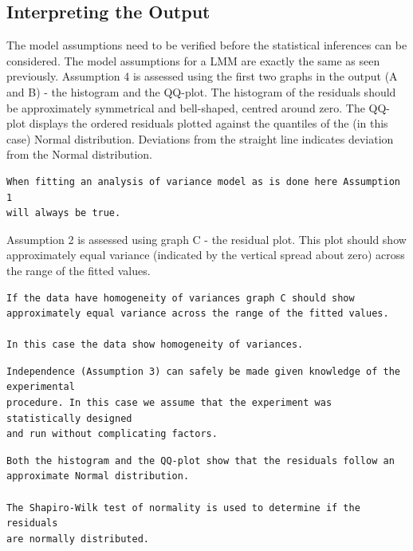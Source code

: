\documentclass[a4paper, 10pt, fleqn, twosided]{memoir}
\begin{document}
\subsection{Interpreting the Output}

The model assumptions need to be verified before the statistical inferences can be considered. The model assumptions
for a LMM are exactly the same as seen previously. Assumption 4 is assessed using the first two graphs in the output (A
and B) - the histogram and the QQ-plot. The histogram of the residuals should be approximately symmetrical and
bell-shaped, centred around zero. The QQ-plot displays the ordered residuals plotted against the quantiles of the (in
this case) Normal distribution. Deviations from the straight line indicates deviation from the Normal distribution.

\begin{tcolorbox}[title = Example 3 Assumption 1]
\begin{verbatim}
When fitting an analysis of variance model as is done here Assumption 1
will always be true.
\end{verbatim}
\end{tcolorbox}


Assumption 2 is assessed using graph C - the residual plot. This plot should show approximately equal variance
(indicated by the vertical spread about zero) across the range of the fitted values.

\begin{tcolorbox}[title = Example 3 Assumption 2]
\begin{verbatim}
If the data have homogeneity of variances graph C should show
approximately equal variance across the range of the fitted values.

In this case the data show homogeneity of variances.
\end{verbatim}
\end{tcolorbox}

\begin{tcolorbox}[title = Example 3 Assumption 3]
\begin{verbatim}
Independence (Assumption 3) can safely be made given knowledge of the experimental
procedure. In this case we assume that the experiment was statistically designed
and run without complicating factors.
\end{verbatim}
\end{tcolorbox}

\begin{tcolorbox}[title = Example 3 Assumption 4]
\begin{verbatim}
Both the histogram and the QQ-plot show that the residuals follow an
approximate Normal distribution.

The Shapiro-Wilk test of normality is used to determine if the residuals
are normally distributed.
\end{verbatim}
\end{tcolorbox}
\end{document}
